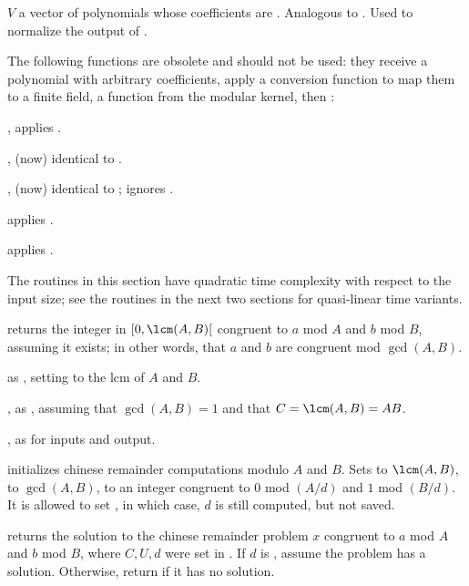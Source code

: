  $V$ a vector of polynomials whose
coefficients are . Analogous to .
Used to normalize the output of .

The following functions are obsolete and should not be used: they receive a
polynomial with arbitrary coefficients, apply a conversion function to map
them to a finite field, a function from the modular kernel, then
:

, applies .

, (now) identical to .

, (now) identical to
; ignores \fl.

 applies .

 applies .

The routines in this section have quadratic time complexity with respect to
the input size; see the routines in the next two sections for quasi-linear
time variants.

 returns the integer
in $[0, \lcm(A,B)[$ congruent to $a$ mod $A$ and $b$ mod $B$, assuming it
exists; in other words, that $a$ and $b$ are congruent mod $\gcd(A,B)$.

 as
, setting  to the lcm of $A$ and $B$.

, as
, assuming that $\gcd(A,B) = 1$ and that $C = \lcm(A,B) = AB$.

, as
 for  inputs and output.

initializes chinese remainder computations modulo $A$ and $B$. Sets
 to $\lcm(A,B)$,  to $\gcd(A,B)$,
 to an integer congruent to $0$ mod $(A/d)$ and $1$ mod $(B/d)$.
It is allowed to set , in which case, $d$ is still
computed, but not saved.

 returns
the solution to the chinese remainder problem $x$ congruent
to $a$ mod $A$ and $b$ mod $B$, where $C, U, d$ were set in
. If $d$ is , assume the problem has a
solution. Otherwise, return  if it has no solution.

